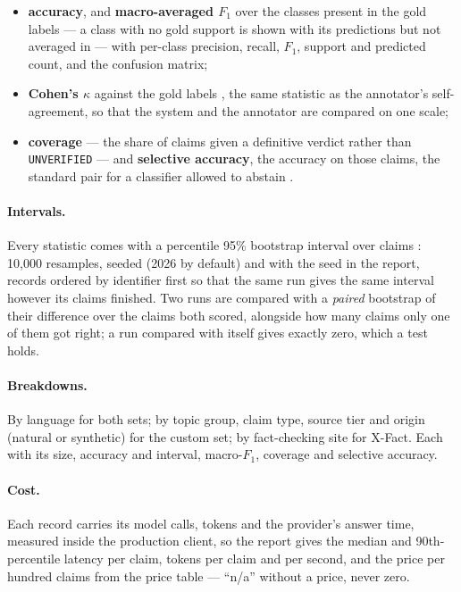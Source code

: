 \begin{itemize}
    \item \textbf{accuracy}, and \textbf{macro-averaged $F_1$} over the
    classes present in the gold labels --- a class with no gold support
    is shown with its predictions but not averaged in --- with
    per-class precision, recall, $F_1$, support and predicted count, and
    the confusion matrix;
    \item \textbf{Cohen's $\kappa$} against the gold labels
    \cite{cohen1960coefficient}, the same statistic as the annotator's
    self-agreement, so that the system and the annotator are compared
    on one scale;
    \item \textbf{coverage} --- the share of claims given a definitive
    verdict rather than \texttt{UNVERIFIED} --- and \textbf{selective
    accuracy}, the accuracy on those claims, the standard pair for a
    classifier allowed to abstain \cite{geifman2017selective}.
\end{itemize}

\paragraph{Intervals.} Every statistic comes with a percentile 95\%
bootstrap interval over claims \cite{efron1993bootstrap}: 10,000
resamples, seeded (2026 by default) and with the seed in the report,
records ordered by identifier first so that the same run gives the same
interval however its claims finished. Two runs are compared with a
\emph{paired} bootstrap of their difference over the claims both
scored, alongside how many claims only one of them got right; a run
compared with itself gives exactly zero, which a test holds.

\paragraph{Breakdowns.} By language for both sets; by topic group,
claim type, source tier and origin (natural or synthetic) for the
custom set; by fact-checking site for X-Fact. Each with its size,
accuracy and interval, macro-$F_1$, coverage and selective accuracy.

\paragraph{Cost.} Each record carries its model calls, tokens and the
provider's answer time, measured inside the production client, so the
report gives the median and 90th-percentile latency per claim, tokens
per claim and per second, and the price per hundred claims from the
price table --- ``n/a'' without a price, never zero.
